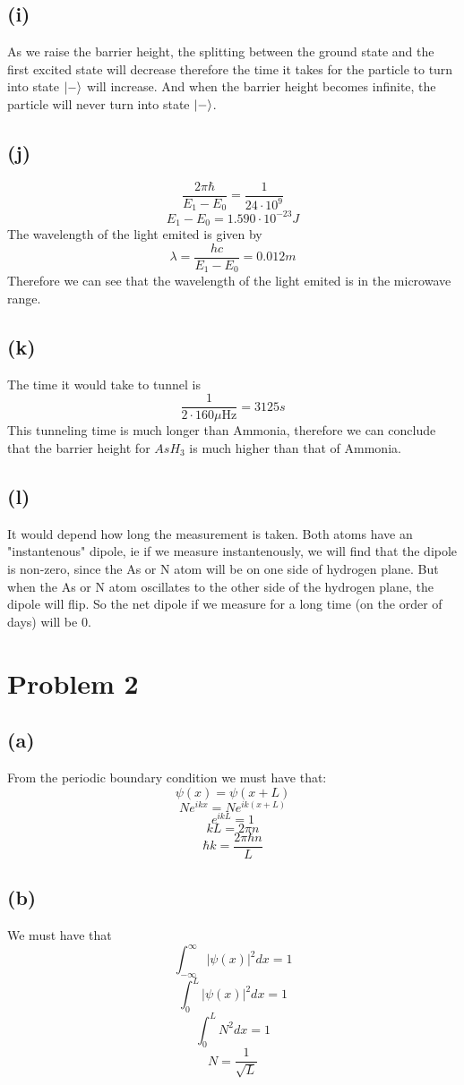 \documentclass[11pt]{article}
\begin{document}
\subsection*{(i)}
As we raise the barrier height, the splitting between the ground state and 
the first excited state will decrease therefore 
the time it takes for the particle to turn into state $\ket{-}$ will increase. And when 
the barrier height becomes infinite, the particle will never turn into state $\ket{-}$. 
\subsection*{(j)}
$$\frac{2\pi\hbar}{E_1-E_0} = \frac{1}{24\cdot10^9}$$
$$E_1-E_0 = 1.590\cdot 10^{-23}J$$
The wavelength of the light emited is given by 
$$\lambda = \frac{hc}{E_1-E_0} = 0.012m$$
Therefore we can see that the wavelength of the light emited is in the
microwave range. 
\subsection*{(k)}
The time it would take to tunnel is 
$$\frac{1}{2\cdot 160\mu \text{Hz}} = 3125s$$
This tunneling time is much longer than Ammonia, therefore we can conclude 
that the barrier height for $AsH_3$ is much higher than that of Ammonia.
\subsection*{(l)}
It would depend how long the measurement is taken. Both atoms have an "instantenous" dipole,
ie if we measure instantenously, we will find that the dipole is non-zero, since the 
As or N atom will be on one side of hydrogen plane. But when
the As or N atom oscillates to the other side of the hydrogen plane, the dipole will flip.
So the net dipole if we measure for a long time (on the order of days) will be $0$.
\section*{Problem 2}
\subsection*{(a)}
From the periodic boundary condition we must have that:
$$\psi(x) = \psi(x+L)$$
$$Ne^{ikx} = Ne^{ik(x+L)}$$
$$e^{ikL} = 1$$
$$kL = 2\pi n$$
$$\hbar k = \frac{2\pi \hbar n}{L}$$
\subsection*{(b)}
We must have that
$$\int_{-\infty}^{\infty}|\psi(x)|^2dx = 1$$
$$\int_{0}^{L}|\psi(x)|^2dx = 1$$
$$\int_{0}^{L}N^2dx = 1$$
$$N = \frac{1}{\sqrt{L}}$$
\end{document}

